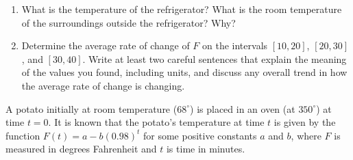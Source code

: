 \documentclass[nooutcomes]{ximera}
\begin{document}
\begin{exploration}
\begin{enumerate}[label=\alph*.]
\begin{image}
\end{image}
\item What is the temperature of the refrigerator? What is the room temperature of the surroundings outside the refrigerator? Why?
\item Determine the average rate of change of $F$ on the intervals $[10,20]$, $[20,30]$, and $[30,40]$. Write at least two careful sentences that explain the meaning of the values you found, including units, and discuss any overall trend in how the average rate of change is changing.
\end{enumerate}
\end{exploration}


\begin{exploration}
A potato initially at room temperature ($68^\circ$) is placed in an oven (at $350^\circ$) at time $t = 0$. It is known that the potato's temperature at time $t$ is given by the function $F(t) = a - b(0.98)^t$ for some positive constants $a$ and $b$, where $F$ is measured in degrees Fahrenheit and $t$ is time in minutes.


\end{exploration}
\end{document}
